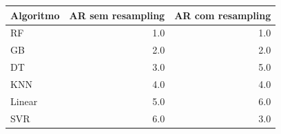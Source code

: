 \begin{tabular}{lrr}
\toprule
Algoritmo & AR sem resampling & AR com resampling \\
\midrule
RF & 1.0 & 1.0 \\
GB & 2.0 & 2.0 \\
DT & 3.0 & 5.0 \\
KNN & 4.0 & 4.0 \\
Linear & 5.0 & 6.0 \\
SVR & 6.0 & 3.0 \\
\bottomrule
\end{tabular}
